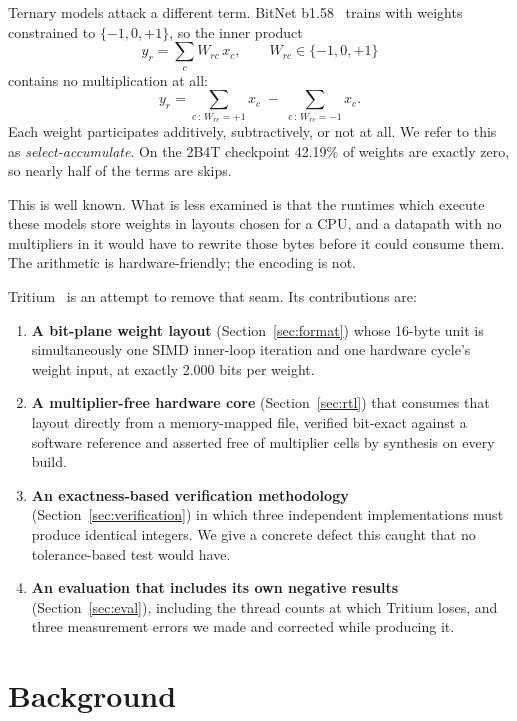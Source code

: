 \documentclass[10pt,twocolumn]{article}
\begin{document}
Ternary models attack a different term. BitNet b1.58~\cite{bitnet158} trains
with weights constrained to $\{-1, 0, +1\}$, so the inner product
\begin{equation}
y_r = \sum_c W_{rc}\, x_c, \qquad W_{rc} \in \{-1,0,+1\}
\end{equation}
contains no multiplication at all:
\begin{equation}
y_r = \sum_{c\,:\,W_{rc}=+1} x_c \;-\; \sum_{c\,:\,W_{rc}=-1} x_c .
\end{equation}
Each weight participates additively, subtractively, or not at all. We refer to
this as \emph{select-accumulate}. On the 2B4T checkpoint 42.19\% of weights are
exactly zero, so nearly half of the terms are skips.

This is well known. What is less examined is that the runtimes which execute
these models store weights in layouts chosen for a CPU, and a datapath with no
multipliers in it would have to rewrite those bytes before it could consume
them. The arithmetic is hardware-friendly; the encoding is not.

Tritium~\cite{tritium} is an attempt to remove that seam. Its contributions
are:

\begin{enumerate}
\item \textbf{A bit-plane weight layout} (Section~\ref{sec:format}) whose
      16-byte unit is simultaneously one SIMD inner-loop iteration and one
      hardware cycle's weight input, at exactly 2.000 bits per weight.
\item \textbf{A multiplier-free hardware core} (Section~\ref{sec:rtl}) that
      consumes that layout directly from a memory-mapped file, verified
      bit-exact against a software reference and asserted free of multiplier
      cells by synthesis on every build.
\item \textbf{An exactness-based verification methodology}
      (Section~\ref{sec:verification}) in which three independent
      implementations must produce identical integers. We give a concrete
      defect this caught that no tolerance-based test would have.
\item \textbf{An evaluation that includes its own negative results}
      (Section~\ref{sec:eval}), including the thread counts at which Tritium
      loses, and three measurement errors we made and corrected while producing
      it.
\end{enumerate}

\section{Background}
\end{document}
